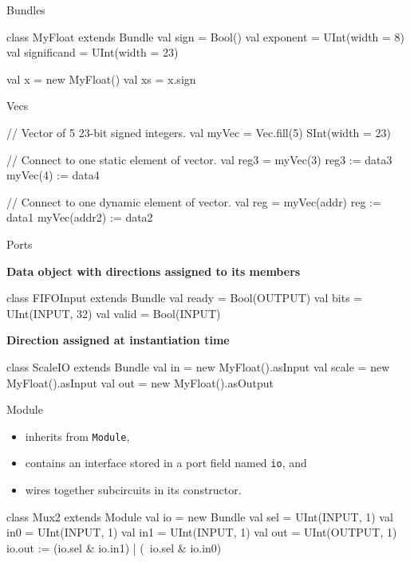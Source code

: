 \documentclass[xcolor=pdflatex,dvipsnames,table]{beamer}
\begin{document}
\begin{frame}[fragile]{Bundles}
\begin{scala}
class MyFloat extends Bundle {
  val sign        = Bool()
  val exponent    = UInt(width = 8)
  val significand = UInt(width = 23)
}

val x  = new MyFloat()
val xs = x.sign
\end{scala}
\end{frame}

\begin{frame}[fragile]{Vecs}
\begin{scala}
// Vector of 5 23-bit signed integers.
val myVec = Vec.fill(5) { SInt(width = 23) } 

// Connect to one static element of vector.
val reg3  = myVec(3)                   
reg3     := data3 
myVec(4) := data4

// Connect to one dynamic element of vector.
val reg       = myVec(addr)
reg          := data1
myVec(addr2) := data2
\end{scala}
\end{frame}

\begin{frame}[fragile]{Ports}

\textbf{Data object with directions assigned to its members}

\begin{scala}
class FIFOInput extends Bundle {
  val ready = Bool(OUTPUT)
  val bits  = UInt(INPUT, 32)
  val valid = Bool(INPUT)
}
\end{scala}

\textbf{Direction assigned at instantiation time}

\begin{scala}
class ScaleIO extends Bundle {
  val in    = new MyFloat().asInput
  val scale = new MyFloat().asInput
  val out   = new MyFloat().asOutput
}
\end{scala}
\end{frame}

\begin{frame}[fragile]{Module}

\begin{itemize}
\item inherits from \verb+Module+,
\item contains an interface stored in a port field named \verb+io+, and
\item wires together subcircuits in its constructor.
\end{itemize}

\begin{scala}
class Mux2 extends Module {
  val io = new Bundle{
    val sel = UInt(INPUT, 1)
    val in0 = UInt(INPUT, 1)
    val in1 = UInt(INPUT, 1)
    val out = UInt(OUTPUT, 1)
  }
  io.out := (io.sel & io.in1) | (~io.sel & io.in0)
}
\end{scala}

\end{frame}
\end{document}
